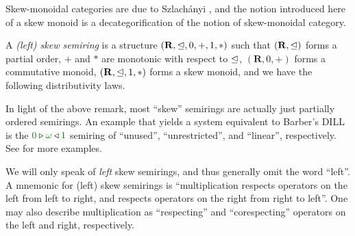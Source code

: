 \documentclass[submission,copyright,creativecommons]{eptcs}
\begin{document}
Skew-monoidal categories are due to Szlach\'anyi \cite{skew}, and the notion
introduced here of a skew monoid is a decategorification of the notion of
skew-monoidal category.

\begin{definition}
  A \emph{(left) skew semiring} is a structure
  $(\mathbf R, \trianglelefteq, 0, +, 1, *)$ such that $(\mathbf R, \trianglelefteq)$ forms a
  partial order, $+$ and $*$ are monotonic with respect to $\trianglelefteq$,
  $(\mathbf R, 0, +)$ forms a commutative monoid, $(\mathbf R, \trianglelefteq, 1, *)$
  forms a skew monoid, and we have the following distributivity laws.
\end{definition}

\begin{example}
  In light of the above remark, most ``skew'' semirings are actually
  just partially ordered semirings. An example that yields a system
  equivalent to Barber's DILL is the
  $\zero \triangleright \unrestricted \triangleleft \linear$
  semiring of ``unused'', ``unrestricted'', and ``linear'', respectively.
  See \cite{Granule18} for more examples.
\end{example}

We will only speak of \emph{left} skew semirings, and thus generally
omit the word ``left''.  A mnemonic for (left) skew semirings is
``multiplication respects operators on the left from left to right,
and respects operators on the right from right to left''.  One may
also describe multiplication as ``respecting'' and ``corespecting''
operators on the left and right, respectively.
\end{document}
